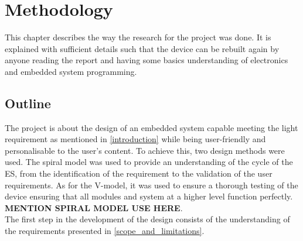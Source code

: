 \chapter{Methodology}

This chapter describes the way the research for the project was done. It is explained with sufficient details such that the device can be rebuilt again by anyone reading the report and having some basics understanding of electronics and embedded system programming.

\section{Outline}
The project is about the design of an embedded system capable meeting the light requirement as mentioned in \cref{introduction} while being user-friendly and personalisable to the user's content. To achieve this, two design methods were used. The spiral model was used to provide an understanding of the cycle of the ES, from the identification of the requirement to the validation of the user requirements. As for the  V-model, it was used to ensure a thorough testing of the device ensuring that all modules and system at a higher level function perfectly. \\
{\bf MENTION SPIRAL MODEL USE HERE}.\\
The first step in the development of the design consists of the understanding of the requirements presented in \cref{scope_and_limitations}.
